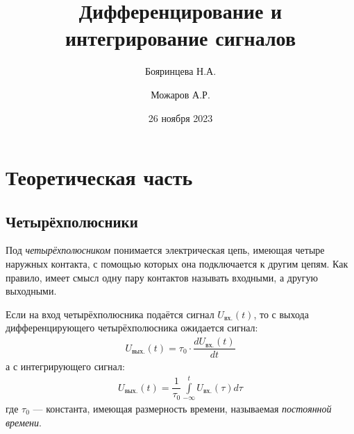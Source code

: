 \documentclass[a4paper]{article}
\title{Дифференцирование и интегрирование сигналов}
\author{Бояринцева Н.А. \and Можаров А.Р.}
\date{26 ноября 2023}
\begin{document}
\maketitle

\section*{\centering Теоретическая часть}

\subsection*{Четырёхполюсники}

Под {\it четырёхполюсником} понимается электрическая цепь,
имеющая четыре наружных контакта,
с помощью которых она подключается к другим цепям.
Как правило, имеет смысл одну пару контактов называть входными,
а другую выходными.

Если на вход четырёхполюсника подаётся сигнал $U_\text{вх.}(t)$,
то с выхода дифференцирующего четырёхполюсника ожидается сигнал:
\begin{gather*}
    U_\text{вых.}(t) = \tau_0 \cdot \dfrac{dU_\text{вх.}(t)}{dt}
\end{gather*}
а с интегрирующего сигнал:
\begin{gather*}
    U_\text{вых.}(t) = \dfrac{1}{\tau_0} \int\limits_{-\infty}^{t} U_\text{вх.}(\tau)d\tau
\end{gather*}
где $\tau_0$ --- константа, имеющая размерность времени,
называемая {\it постоянной времени}.
\end{document}
